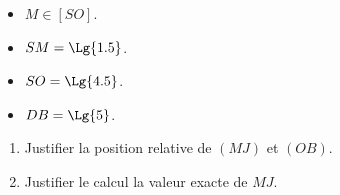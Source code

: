 \begin{exercice*}
\begin{minipage}{0.8\linewidth}
{    
        }
    \end{minipage}
    \begin{minipage}{0.3\linewidth}
        \begin{itemize}
            \item $M \in [SO]$.
            \item $SM=\Lg{1.5}$.
            \item $SO=\Lg{4.5}$.
            \item $DB=\Lg{5}$.
        \end{itemize}
    \end{minipage}
    \begin{enumerate}
        \item Justifier la position relative de $(MJ)$ et $(OB)$.
        \item Justifier le calcul la valeur exacte de $MJ$.
    \end{enumerate}
\end{exercice*}
